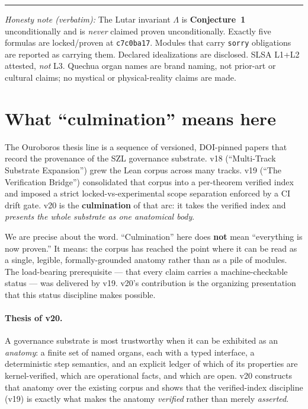 \documentclass[11pt]{article}
\theoremstyle{plain}
\theoremstyle{definition}
\theoremstyle{remark}
\newcommand{\La}{\Lambda}
\begin{document}
\vspace{0.5em}\hrule\vspace{0.5em}
\noindent\small\textit{Honesty note (verbatim):} The Lutar invariant $\La$ is
\textbf{Conjecture~1} unconditionally and is \emph{never} claimed proven
unconditionally. Exactly five formulas are locked/proven at \texttt{c7c0ba17}. Modules
that carry \texttt{sorry} obligations are reported as carrying them. Declared
idealizations are disclosed. SLSA L1+L2 attested, \emph{not} L3. Quechua organ names are
brand naming, not prior-art or cultural claims; no mystical or physical-reality claims
are made.
\normalsize

\tableofcontents
\newpage

\section{What ``culmination'' means here}
\label{sec:intro}

The Ouroboros thesis line is a sequence of versioned, DOI-pinned papers that record the
provenance of the SZL governance substrate. v18 (``Multi-Track Substrate Expansion'')
grew the Lean corpus across many tracks. v19 (``The Verification Bridge'') consolidated
that corpus into a per-theorem verified index and imposed a strict
locked-vs-experimental scope separation enforced by a CI drift gate. v20 is the
\textbf{culmination} of that arc: it takes the verified index and \emph{presents the
whole substrate as one anatomical body}.

We are precise about the word. ``Culmination'' here does \textbf{not} mean ``everything
is now proven.'' It means: the corpus has reached the point where it can be read as a
single, legible, formally-grounded anatomy rather than as a pile of modules. The
load-bearing prerequisite --- that every claim carries a machine-checkable status ---
was delivered by v19. v20's contribution is the organizing presentation that this
status discipline makes possible.

\paragraph{Thesis of v20.}
A governance substrate is most trustworthy when it can be exhibited as an \emph{anatomy}:
a finite set of named organs, each with a typed interface, a deterministic step
semantics, and an explicit ledger of which of its properties are kernel-verified, which
are operational facts, and which are open. v20 constructs that anatomy over the existing
corpus and shows that the verified-index discipline (v19) is exactly what makes the
anatomy \emph{verified} rather than merely \emph{asserted}.
\end{document}
